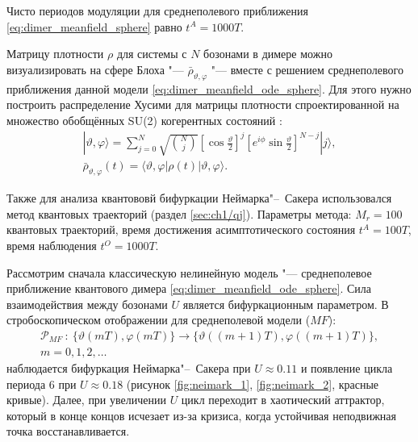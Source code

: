 Чисто периодов модуляции для среднеполевого приближения \cref{eq:dimer_meanfield_sphere} равно \(t^A = 1000T\).

Матрицу плотности \(\rho\) для системы с \(N\) бозонами в димере можно визуализировать на сфере Блоха \cite{Nielsen2010} "--- \(\bar{\rho}_{\vartheta, \varphi}\) "--- вместе с решением среднеполевого приближения данной модели \cref{eq:dimer_meanfield_ode_sphere}. Для этого нужно построить распределение Хусими \cite{Stockmann2006} для матрицы плотности спроектированной на множество обобщённых SU(2) когерентных состояний \cite{Arecchi1972}:
\begin{equation}
	\label{eq:dimer_husimi}
	\begin{gathered}
		|\vartheta , \varphi \rangle = \sum_{j=0}^{N}\sqrt{\binom{N}{j}}\left[\cos{\frac{\vartheta}{2}}\right]^j \left[e^{i\phi}\sin{\frac{\vartheta}{2}}\right]^{N-j} |j\rangle, \\
		\bar{\rho}_{\vartheta, \varphi}(t) = \langle \vartheta , \varphi| \rho(t) |\vartheta , \varphi \rangle.
	\end{gathered}
\end{equation}

Также для анализа квантововй бифуркации Неймарка"--~Сакера использовался метод квантовых траекторий (раздел \cref{sec:ch1/qj}). Параметры метода: \(M_r=100\) квантовых траекторий, время достижения асимптотического состояния \(t^A = 100T\), время наблюдения \(t^O = 1000T\).

Рассмотрим сначала классическую нелинейную модель "--- среднеполевое приближение квантового димера \cref{eq:dimer_meanfield_ode_sphere}.
Сила взаимодействия между бозонами \(U\) является бифуркационным параметром.
В стробоскопическом отображении для среднеполевой модели (\(MF\)):
\begin{equation}
	\label{eq:dimer_stroboscopic_mf}
	\begin{gathered}
		\mathcal{P}_{MF}~:~\{\vartheta(mT),\varphi(mT)\} \to \{\vartheta((m+1)T),\varphi((m+1)T)\}, \\
		m=0, 1, 2, \ldots
	\end{gathered}
\end{equation}
наблюдается бифуркация Неймарка"--~Сакера при \(U\approx0.11\) и появление цикла периода 6 при \(U\approx0.18\) (рисунок \cref{fig:neimark_1}, \cref{fig:neimark_2}, красные кривые).
Далее, при увеличении \(U\) цикл переходит в хаотический аттрактор, который в конце концов исчезает из-за кризиса, когда устойчивая неподвижная точка восстанавливается.


